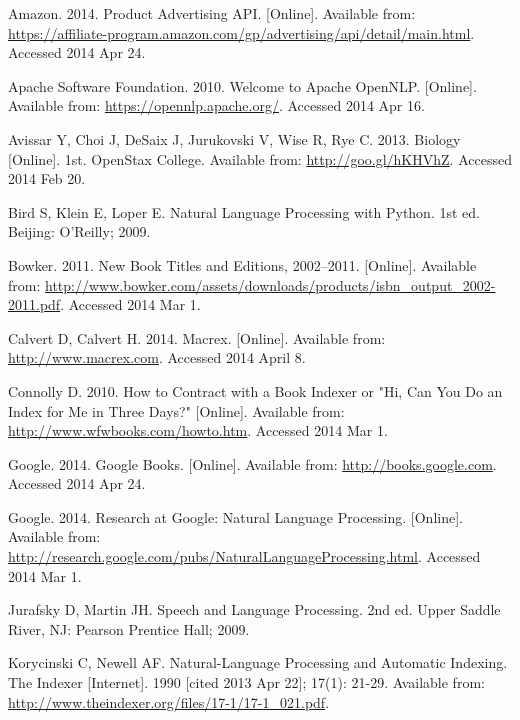 \cleardoublepage
{}
{}
\begin{thebibliography}{99}
\hypersetup{ocgcolorlinks=false}
Amazon. 2014. Product Advertising API. [Online]. Available from: \url{https://affiliate-program.amazon.com/gp/advertising/api/detail/main.html}. Accessed 2014 Apr 24.

Apache Software Foundation. 2010. Welcome to Apache OpenNLP. [Online]. Available from: \url{https://opennlp.apache.org/}. Accessed 2014 Apr 16.

Avissar Y, Choi J, DeSaix J, Jurukovski V, Wise R, Rye C. 2013. Biology [Online]. 1st. OpenStax College. Available from: \url{http://goo.gl/hKHVhZ}. Accessed 2014 Feb 20.

Bird S, Klein E, Loper E. Natural Language Processing with Python. 1st ed. Beijing: O'Reilly; 2009.

Bowker. 2011. New Book Titles and Editions, 2002--2011. [Online]. Available from: \url{http://www.bowker.com/assets/downloads/products/isbn_output_2002-2011.pdf}. Accessed 2014 Mar 1.

Calvert D, Calvert H. 2014. Macrex. [Online]. Available from: \url{http://www.macrex.com}. Accessed 2014 April 8.

Connolly D. 2010. How to Contract with a Book Indexer or "Hi, Can You Do an Index for Me in Three Days?" [Online]. Available from: \url{http://www.wfwbooks.com/howto.htm}. Accessed 2014 Mar 1.

Google. 2014. Google Books. [Online]. Available from: \url{http://books.google.com}. Accessed 2014 Apr 24.

Google. 2014. Research at Google: Natural Language Processing. [Online]. Available from: \url{http://research.google.com/pubs/NaturalLanguageProcessing.html}. Accessed 2014 Mar 1.

Jurafsky D, Martin JH. Speech and Language Processing. 2nd ed. Upper Saddle River, NJ: Pearson Prentice Hall; 2009.

Korycinski C, Newell AF. Natural-Language Processing and Automatic Indexing. The Indexer [Internet]. 1990 [cited 2013 Apr 22]; 17(1): 21-29. Available from: \url{http://www.theindexer.org/files/17-1/17-1_021.pdf}.


\end{thebibliography}
